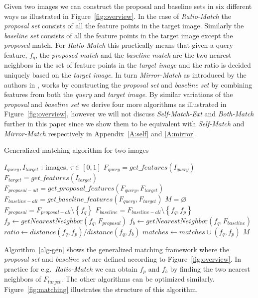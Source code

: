\documentclass[10pt,journal,cspaper,compsoc]{IEEEtran}
\begin{document}
Given two images we can construct the proposal and baseline sets in six 
different ways as illustrated in Figure~\ref{fig:overview}. In the case 
of \emph{Ratio-Match} \cite{lowe2004sift} the \emph{proposal set} 
consists of all the feature points in the target image.  Similarly the 
\emph{baseline set} consists of all the feature points in the target 
image except the \emph{proposed} match. For \emph{Ratio-Match} this 
practically means that given a query feature, $f_q$, the \emph{proposed 
match} and the \emph{baseline match} are the two nearest neighbors in 
the set of feature points in the \emph{target image} and the ratio is 
decided uniquely based on the \emph{target image}. In turn 
\emph{Mirror-Match} as introduced by the authors in 
\cite{arnfred2013mirror}, works by constructing the \emph{proposal set} 
and \emph{baseline set} by combining features from both the \emph{query} 
and \emph{target image}. By similar variations of the \emph{proposal} 
and \emph{baseline set} we derive four more algorithms as illustrated in 
Figure~\ref{fig:overview}, however we will not discuss 
\emph{Self-Match-Ext} and \emph{Both-Match} further in this paper since 
we show them to be equivalent with \emph{Self-Match} and 
\emph{Mirror-Match} respectively in Appendix~\ref{A:self} and 
\ref{A:mirror}.

\begin{algorithm}[htb]
\caption{Generalized matching algorithm for two images}
\label{alg-gen}
\begin{algorithmic}
    \Require $I_{query}, I_{target}$ : images, $\tau \in [0,1]$
    \State $F_{query} = get\_features(I_{query})$
    \State $F_{target} = get\_features(I_{target})$
\State $F_{proposal-all} = get\_proposal\_features(F_{query}, 
F_{target})$
\State $F_{baseline-all} = get\_baseline\_features(F_{query}, 
F_{target})$
\State $M = \varnothing$
    \State $F_{proposal} = F_{proposal-all} \setminus 
    \left\{f_q\right\}$
    \State $F_{baseline} = F_{baseline-all} \setminus \left\{f_q, 
    f_p\right\}$
    \State $f_p \gets getNearestNeighbo\text{r}(f_q, F_{proposal})$
    \State $f_b \gets getNearestNeighbo\text{r}(f_q, F_{baseline})$
    \State $ratio \gets distance(f_q, f_p) / distance(f_q, f_b)$
        \State $matches \gets matches \cup \left(f_q, f_p\right)$
	\EndIf
\EndFor
\Return $M$
\end{algorithmic}
\end{algorithm}

Algorithm~\ref{alg-gen} shows the generalized matching framework 
where the \emph{proposal set} and \emph{baseline set} are defined 
according to Figure~\ref{fig:overview}.  In practice for e.g.\ 
\emph{Ratio-Match} we can obtain $f_p$ and $f_b$ by finding the two 
nearest neighbors of $F_{target}$. The other algorithms can be optimized 
similarly. Figure~\ref{fig:matching} illustrates the structure of 
this algorithm.
\end{document}
